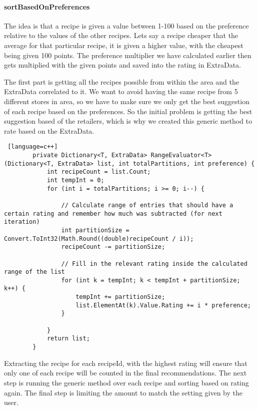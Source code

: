 \paragraph{sortBasedOnPreferences}

The idea is that a recipe is given a value between 1-100 based on the preference relative to the values of the other recipes. Lets say a recipe cheaper that the average for that particular recipe, it is given a higher value, with the cheapest being given 100 points. The preference multiplier we have calculated earlier then gets multiplied with the given points and saved into the rating in ExtraData.

The first part is getting all the recipes possible from within the area and the ExtraData correlated to it. We want to avoid having the same recipe from 5 different stores in area, so we have to make sure we only get the best suggestion of each recipe based on the preferences. So the initial problem is getting the best suggestion based of the retailers, which is why we created this generic method to rate based on the ExtraData.

\begin{lstlisting} [language=c++]
        private Dictionary<T, ExtraData> RangeEvaluator<T>(Dictionary<T, ExtraData> list, int totalPartitions, int preference) {
            int recipeCount = list.Count;
            int tempInt = 0;
            for (int i = totalPartitions; i >= 0; i--) {

                // Calculate range of entries that should have a certain rating and remember how much was subtracted (for next iteration)
                int partitionSize = Convert.ToInt32(Math.Round((double)recipeCount / i));
                recipeCount -= partitionSize;

                // Fill in the relevant rating inside the calculated range of the list
                for (int k = tempInt; k < tempInt + partitionSize; k++) {
                    tempInt += partitionSize;
                    list.ElementAt(k).Value.Rating += i * preference;
                }

            }
            return list;
        }
\end{lstlisting}

Extracting the recipe for each recipeId, with the highest rating will ensure that only one of each recipe will be counted in the final recommendations. The next step is running the generic method over each recipe and sorting based on rating again. The final step is limiting the amount to match the setting given by the user.